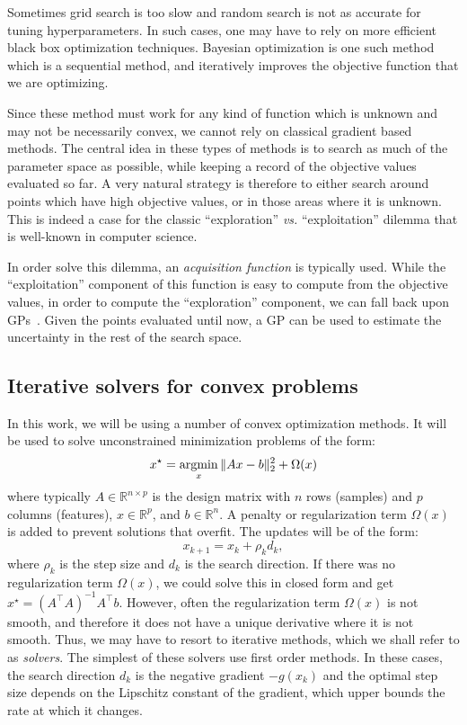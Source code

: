 Sometimes grid search is too slow and random search is not as accurate for tuning hyperparameters. In such cases, one may have to rely on more efficient black box optimization techniques. Bayesian optimization is one such method which is a sequential method, and iteratively improves the objective function that we are optimizing.

Since these method must work for any kind of function which is unknown and may not be necessarily convex, we cannot rely on classical gradient based methods. The central idea in these types of methods is to search as much of the parameter space as possible, while keeping a record of the objective values evaluated so far. A very natural strategy is therefore to either search around points which have high objective values, or in those areas where it is unknown. This is indeed a case for the classic  ``exploration'' \emph{vs.} ``exploitation'' dilemma that is well-known in computer science.

In order solve this dilemma, an \emph{acquisition function} is typically used. While the ``exploitation'' component of this function is easy to compute from the objective values, in order to compute the ``exploration'' component, we can fall back upon \acp{GP}~\citep{rasmussen2004gaussian}. Given the points evaluated until now, a \ac{GP} can be used to estimate the uncertainty in the rest of the search space. 


\subsection{Iterative solvers for convex problems}
In this work, we will be using a number of convex optimization methods. It will be used to solve unconstrained minimization problems of the form:
\begin{equation}
x^{\star} = \mathop{\mathrm{argmin}}_x \|Ax - b\|_{2}^2 + \Omega(x)
\end{equation}
%
where typically $A \in \mathbb{R}^{n \times p}$ is the design matrix with $n$ rows (samples) and $p$ columns (features), $x \in \mathbb{R}^p$, and $b \in \mathbb{R}^n$. A penalty or regularization term $\Omega(x)$ is added to prevent solutions that overfit. The updates will be of the  form:
%
\begin{equation}
x_{k + 1} = x_{k} + \rho_k d_k,
\end{equation}
%
where $\rho_k$ is the step size and $d_k$ is the search direction.
If there was no regularization term $\Omega(x)$, we could solve this in closed form and get $x^{\star} = {(A^{\top}A)}^{-1}A^{\top}b$. However, often the regularization term $\Omega(x)$ is not smooth, and therefore it does not have a unique derivative where it is not smooth. Thus, we may have to resort to iterative methods, which we shall refer to as \emph{solvers}. The simplest of these solvers use first order methods. In these cases, the search direction $d_k$ is the negative gradient $-g(x_k)$ and the optimal step size depends on the Lipschitz constant of the gradient, which upper bounds the rate at which it changes. 

